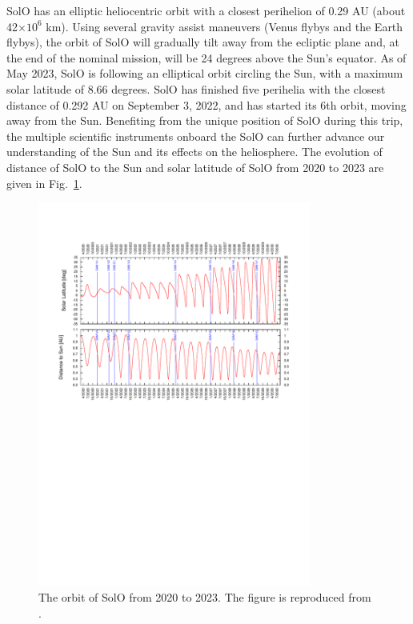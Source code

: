 \ac{SolO} has an elliptic heliocentric orbit with a closest perihelion of 0.29 AU (about 42$\times10^6$ km). Using several gravity assist maneuvers (Venus flybys and the Earth flybys), the orbit of \ac{SolO} will gradually tilt away from the ecliptic plane and, at the end of the nominal mission, will be 24 degrees above the Sun's equator. As of May 2023, \ac{SolO} is following an elliptical orbit circling the Sun, with a maximum solar latitude of 8.66 degrees. \ac{SolO} has finished five perihelia with the closest distance of 0.292 AU on September 3, 2022, and has started its 6th orbit, moving away from the Sun. Benefiting from the unique position of \ac{SolO} during this trip, the multiple scientific instruments onboard the \ac{SolO} can further advance our understanding of the Sun and its effects on the heliosphere. The evolution of distance of \ac{SolO} to the Sun and solar latitude of \ac{SolO} from 2020 to 2023 are given in Fig.~\ref{figL:SOLO_orbit_muller}.
\begin{figure}[ht]
    \centering
    \includegraphics[width=0.8\textwidth]{images/Muller2020-fig28.pdf}
    \caption[The orbit of \ac{SolO} between 2020-2030]{The orbit of \ac{SolO} from 2020 to 2023. The figure is reproduced from \citet{Mueller-2020-SolO}.}
    \label{figL:SOLO_orbit_muller}
\end{figure}

